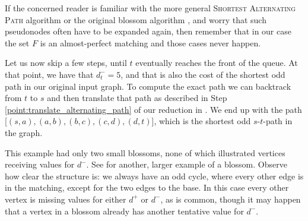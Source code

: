 If the concerned reader is familiar with the more general \textsc{Shortest Alternating Path} algorithm \cite{source:shortest_alternating_path} or the original blossom algorithm \cite{source:blossom}, and worry that such pseudonodes often have to be expanded again, then remember that in our case the set $F$ is an almost-perfect matching and those cases never happen.

Let us now skip a few steps, until $t$ eventually reaches the front of the queue. At that point, we have that $d^-_t = 5$, and that is also the cost of the shortest odd path in our original input graph. To compute the exact path we can backtrack from $t$ to $s$ and then translate that path as described in Step \ref{point:translate_alternating_path} of our reduction in . We end up with the path [$(s,a),(a,b),(b,c),(c,d),(d,t)$], which is the shortest odd $s$-$t$-path in the graph.

This example had only two small blossoms, none of which illustrated vertices receiving values for $d^-$. See  for another, larger example of a blossom. Observe how clear the structure is: we always have an odd cycle, where every other edge is in the matching, except for the two edges to the base. In this case every other vertex is missing values for either $d^+$ or $d^-$, as is common, though it may happen that a vertex in a blossom already has another tentative value for $d^-$.

